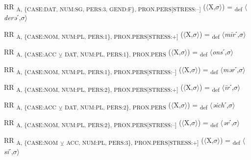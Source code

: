 {\begin{exe}
 RR \textsubscript{A, \{CASE:DAT, NUM:SG, PERS:3, GEND:F\}, PRON.PERS[STRESS:–]} ($\langle$X,$\sigma $$\rangle$) = \textsubscript{def} $\langle$\textit{derə}ˊ,$\sigma $$\rangle$
\end{exe}

\begin{exe}
 RR \textsubscript{A, \{CASE:NOM, NUM:PL, PERS:1\}, PRON.PERS[STRESS:+]} ($\langle$X,$\sigma $$\rangle$) = \textsubscript{def} $\langle$\textit{m\=ir}ˊ,$\sigma $$\rangle$
\end{exe}

\begin{exe}
 RR \textsubscript{A, \{CASE:ACC} \textsubscript{${\veebar}$}\textsubscript{ DAT, NUM:PL, PERS:1\}, PRON.PERS} ($\langle$X,$\sigma $$\rangle$) = \textsubscript{def} $\langle$\textit{ons}ˊ,$\sigma $$\rangle$
\end{exe}

\begin{exe}
 RR \textsubscript{A, \{CASE:NOM, NUM:PL, PERS:1\}, PRON.PERS[STRESS:–]} ($\langle$X,$\sigma $$\rangle$) = \textsubscript{def} $\langle$\textit{mər}ˊ,$\sigma $$\rangle$
\end{exe}

\begin{exe}
 RR \textsubscript{A, \{CASE:NOM, NUM:PL, PERS:2\}, PRON.PERS[STRESS:+]} ($\langle$X,$\sigma $$\rangle$) = \textsubscript{def} $\langle$\textit{\=ir}ˊ,$\sigma $$\rangle$
\end{exe}

\begin{exe}
 RR \textsubscript{A, \{CASE:ACC} \textsubscript{${\veebar}$}\textsubscript{ DAT, NUM:PL, PERS:2\}, PRON.PERS} ($\langle$X,$\sigma $$\rangle$) = \textsubscript{def} $\langle$\textit{əich}ˊ,$\sigma $$\rangle$
\end{exe}

\begin{exe}
 RR \textsubscript{A, \{CASE:NOM, NUM:PL, PERS:2\}, PRON.PERS[STRESS:–]} ($\langle$X,$\sigma $$\rangle$) = \textsubscript{def} $\langle$\textit{ər}ˊ,$\sigma $$\rangle$
\end{exe}

\begin{exe}
 RR \textsubscript{A, \{CASE:NOM} \textsubscript{${\veebar}$}\textsubscript{ ACC, NUM:PL, PERS:3\}, PRON.PERS[STRESS:+]} ($\langle$X,$\sigma $$\rangle$) = \textsubscript{def} $\langle$\textit{s\=i}ˊ,$\sigma $$\rangle$
\end{exe}

}
